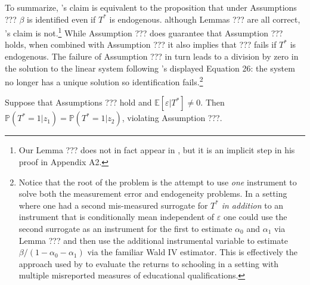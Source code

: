 To summarize, \citeauthor{Mahajan}'s claim is equivalent to the proposition that under Assumptions ??? $\beta$ is identified even if $T^*$ is endogenous.
although Lemmas ??? are all correct, \citeauthor{Mahajan}'s claim is not.\footnote{Our Lemma ??? does not in fact appear in \cite{Mahajan}, but it is an implicit step in his proof in Appendix A2.}
While Assumption ??? does guarantee that Assumption ??? holds, when combined with Assumption ??? it also implies that ??? fails if $T^*$ is endogenous.
The failure of Assumption ??? in turn leads to a division by zero in the solution to the linear system following \citeauthor{Mahajan}'s displayed Equation 26: the system no longer has a unique solution so identification fails.\footnote{Notice that the root of the problem is the attempt to use \emph{one} instrument to solve both the measurement error and endogeneity problems. In a setting where one had a second mis-measured surrogate for $T^*$ \emph{in addition} to an instrument that is conditionally mean independent of $\varepsilon$ one could use the second surrogate as an instrument for the first to estimate $\alpha_0$ and $\alpha_1$ via Lemma ??? and then use the additional instrumental variable to estimate $\beta/(1 - \alpha_0 - \alpha_1)$ via the familiar Wald IV estimator. This is effectively the approach used by \cite{Batt} to evaluate the returns to schooling in a setting with multiple misreported measures of educational qualifications.}
\begin{pro}
  Suppose that Assumptions ??? hold and $\mathbb{E}[\varepsilon|T^*]\neq0$. Then $\mathbb{P}(T^*=1|z_1) = \mathbb{P}(T^*=1|z_2)$, violating Assumption ???. 
\end{pro}

